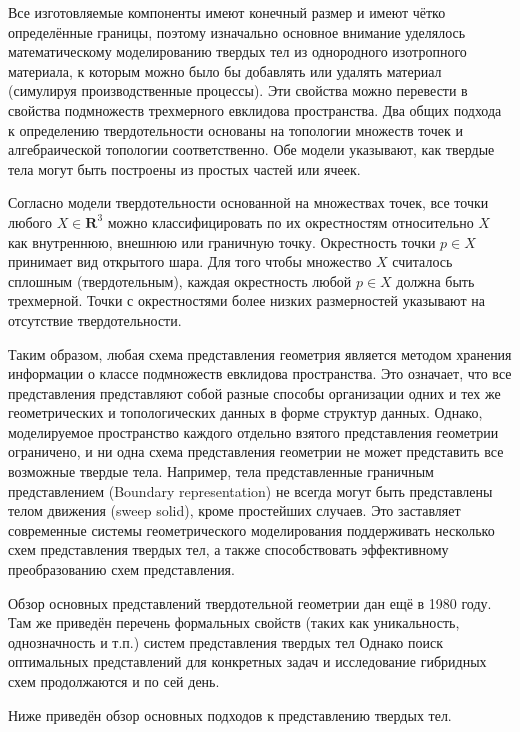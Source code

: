Все изготовляемые компоненты имеют конечный размер и имеют чётко определённые границы, поэтому изначально основное внимание уделялось математическому моделированию твердых тел из однородного изотропного материала, к которым можно было бы добавлять или удалять материал (симулируя производственные процессы). Эти свойства можно перевести в свойства подмножеств трехмерного евклидова пространства. Два общих подхода к определению твердотельности основаны на топологии множеств точек и алгебраической топологии соответственно. Обе модели указывают, как твердые тела могут быть построены из простых частей или ячеек.

Согласно модели твердотельности основанной на множествах точек, все точки любого $X \in \mathbf{R}^3$ можно классифицировать по их окрестностям относительно $X$ как внутреннюю, внешнюю или граничную точку. Окрестность точки $p \in X$ принимает вид открытого шара. Для того чтобы множество $X$ считалось сплошным (твердотельным), каждая окрестность любой $p \in X$ должна быть трехмерной. Точки с окрестностями более низких размерностей указывают на отсутствие твердотельности.


Таким образом, любая схема представления геометрия является методом хранения информации о классе  подмножеств евклидова пространства. Это означает, что все представления представляют собой разные способы организации одних и тех же геометрических и топологических данных в форме структур данных. Однако, моделируемое пространство каждого отдельно взятого представления геометрии ограничено, и ни одна схема представления геометрии не может представить все возможные твердые тела. Например, тела представленные граничным представлением (Boundary representation) не всегда могут быть представлены телом движения (sweep solid), кроме простейших случаев. Это заставляет современные системы геометрического моделирования поддерживать несколько схем представления твердых тел, а также способствовать эффективному преобразованию схем представления.

Обзор основных представлений твердотельной геометрии дан \cite{Requicha80} ещё в 1980 году. Там же приведён перечень формальных свойств (таких как уникальность, однозначность и т.п.) систем представления твердых тел Однако поиск оптимальных представлений для конкретных задач и исследование гибридных схем продолжаются и по сей день.

Ниже приведён обзор основных подходов к представлению твердых тел.


